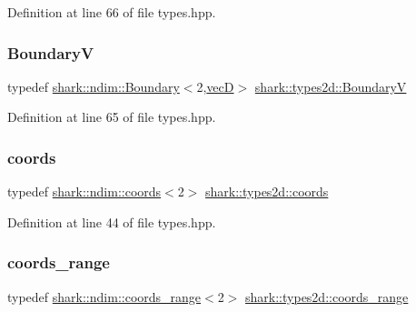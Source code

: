 Definition at line 66 of file types.\+hpp.

\hypertarget{namespaceshark_1_1types2d_a87cb1ad681aa7cf9f43c530c28f80ba4}{}\label{namespaceshark_1_1types2d_a87cb1ad681aa7cf9f43c530c28f80ba4} 
\subsubsection{\texorpdfstring{BoundaryV}{BoundaryV}}
{\footnotesize\ttfamily typedef \hyperlink{classshark_1_1ndim_1_1_boundary}{shark\+::ndim\+::\+Boundary}$<$2,\hyperlink{namespaceshark_1_1types2d_a738ed8ca791a1fce6898c99ca68afc45}{vecD}$>$ \hyperlink{namespaceshark_1_1types2d_a87cb1ad681aa7cf9f43c530c28f80ba4}{shark\+::types2d\+::\+BoundaryV}}



Definition at line 65 of file types.\+hpp.

\hypertarget{namespaceshark_1_1types2d_a1a1f893cb5a62e4302ace27c916fab85}{}\label{namespaceshark_1_1types2d_a1a1f893cb5a62e4302ace27c916fab85} 
\subsubsection{\texorpdfstring{coords}{coords}}
{\footnotesize\ttfamily typedef \hyperlink{structshark_1_1ndim_1_1coords}{shark\+::ndim\+::coords}$<$2$>$ \hyperlink{namespaceshark_1_1types2d_a1a1f893cb5a62e4302ace27c916fab85}{shark\+::types2d\+::coords}}



Definition at line 44 of file types.\+hpp.

\hypertarget{namespaceshark_1_1types2d_ad6b127b4b9b81fb69d24cb8bbf75bd22}{}\label{namespaceshark_1_1types2d_ad6b127b4b9b81fb69d24cb8bbf75bd22} 
\subsubsection{\texorpdfstring{coords\+\_\+range}{coords\_range}}
{\footnotesize\ttfamily typedef \hyperlink{structshark_1_1ndim_1_1coords__range}{shark\+::ndim\+::coords\+\_\+range}$<$2$>$ \hyperlink{namespaceshark_1_1types2d_ad6b127b4b9b81fb69d24cb8bbf75bd22}{shark\+::types2d\+::coords\+\_\+range}}




